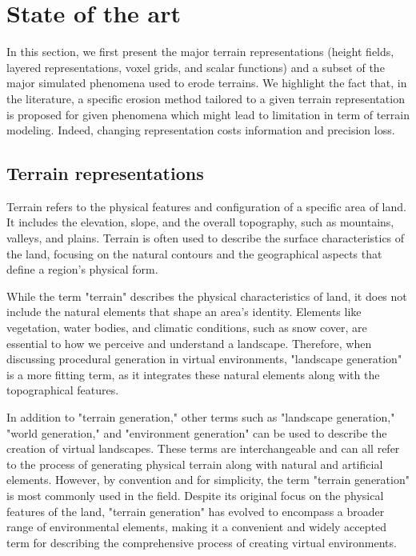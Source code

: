 \section{State of the art}
\label{sec:erosion_state_of_the_art}
In this section, we first present the major terrain representations (height fields, layered representations, voxel grids, and scalar functions) and a subset of the major simulated phenomena used to erode terrains. We highlight the fact that, in the literature, a specific erosion method tailored to a given terrain representation is proposed for given phenomena which might lead to limitation in term of terrain modeling. Indeed, changing representation costs information and precision loss.

\subsection{Terrain representations}

Terrain refers to the physical features and configuration of a specific area of land. It includes the elevation, slope, and the overall topography, such as mountains, valleys, and plains. Terrain is often used to describe the surface characteristics of the land, focusing on the natural contours and the geographical aspects that define a region's physical form.

While the term "terrain" describes the physical characteristics of land, it does not include the natural elements that shape an area's identity. Elements like vegetation, water bodies, and climatic conditions, such as snow cover, are essential to how we perceive and understand a landscape. Therefore, when discussing procedural generation in virtual environments, "landscape generation" is a more fitting term, as it integrates these natural elements along with the topographical features.

In addition to "terrain generation," other terms such as "landscape generation," "world generation," and "environment generation" can be used to describe the creation of virtual landscapes. These terms are interchangeable and can all refer to the process of generating physical terrain along with natural and artificial elements. However, by convention and for simplicity, the term "terrain generation" is most commonly used in the field. Despite its original focus on the physical features of the land, "terrain generation" has evolved to encompass a broader range of environmental elements, making it a convenient and widely accepted term for describing the comprehensive process of creating virtual environments.

